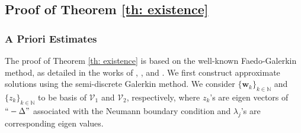 \documentclass[final,3p,times]{elsarticle}
\theoremstyle{plain}
\theoremstyle{remark}
\theoremstyle{plain}
\theoremstyle{remark}
\begin{document}
\subsection{Proof of Theorem \ref{th: existence}}

\subsubsection{A Priori Estimates \label{sec: A Priori Estimates}}

The proof of Theorem \ref{th: existence} is based on the well-known Faedo-Galerkin method, as detailed in the works of \citet{Lions1969}, \citet{Temam1979, Temam1983}, and \citet{Ladyzhenskaya1963}. We first construct approximate solutions using the semi-discrete Galerkin method. We consider $\{\mathbf w_k\}_{k\in \mathds N}$ and $\{z_k\}_{k\in \mathds N}$ to be basis of $\mathscr V_1$ and $\mathscr V_2$, respectively, where $z_k$'s are eigen vectors of $``-\Delta"$ associated with the Neumann boundary condition and $\lambda_j$'s are corresponding eigen values.
\end{document}
